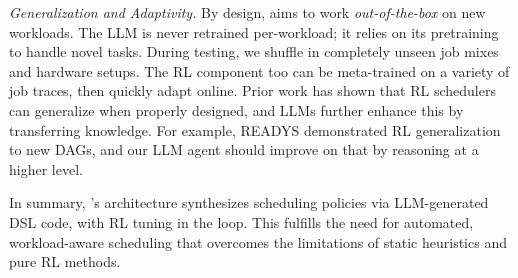 \emph{Generalization and Adaptivity.} By design, \sys{} aims to work \emph{out-of-the-box} on new workloads. The LLM is never retrained per-workload; it relies on its pretraining to handle novel tasks. During testing, we shuffle in completely unseen job mixes and hardware setups. The RL component too can be meta-trained on a variety of job traces, then quickly adapt online. Prior work has shown that RL schedulers can generalize when properly designed, and LLMs further enhance this by transferring knowledge. For example, READYS demonstrated RL generalization to new DAGs, and our LLM agent should improve on that by reasoning at a higher level.

In summary, \sys{}'s architecture synthesizes scheduling policies via LLM-generated DSL code, with RL tuning in the loop. This fulfills the need for automated, workload-aware scheduling that overcomes the limitations of static heuristics and pure RL methods.